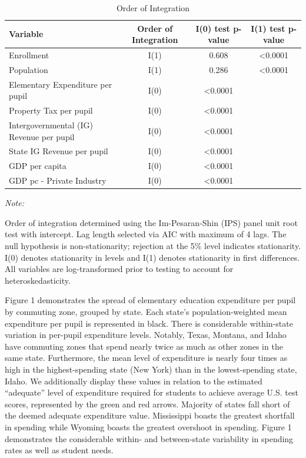 \documentclass[
  10pt,
]{article}
\begin{document}
\begin{table}

\caption{\label{tab:tbl_order_of_integration}Order of Integration}
\centering
\begin{threeparttable}
\begin{tabular}[t]{lccc}
\toprule
Variable & Order of Integration & I(0) test p-value & I(1) test p-value\\
\midrule
Enrollment & I(1) & 0.608 & <0.0001\\
Population & I(1) & 0.286 & <0.0001\\
Elementary Expenditure per pupil & I(0) & <0.0001 & \\
Property Tax per pupil & I(0) & <0.0001 & \\
Intergovernmental (IG) Revenue per pupil & I(0) & <0.0001 & \\
\addlinespace
State IG Revenue per pupil & I(0) & <0.0001 & \\
GDP per capita & I(0) & <0.0001 & \\
GDP pc - Private Industry & I(0) & <0.0001 & \\
\bottomrule
\end{tabular}
\begin{tablenotes}[para]
\item \textit{Note: } 
\item Order of integration determined using the Im-Pesaran-Shin (IPS) panel unit root test with intercept. Lag length selected via AIC with maximum of 4 lags. The null hypothesis is non-stationarity; rejection at the 5\% level indicates stationarity. I(0) denotes stationarity in levels and I(1) denotes stationarity in first differences. All variables are log-transformed prior to testing to account for heteroskedasticity.
\end{tablenotes}
\end{threeparttable}
\end{table}

Figure 1 demonstrates the spread of elementary education expenditure per
pupil by commuting zone, grouped by state. Each state's
population-weighted mean expenditure per pupil is represented in black.
There is considerable within-state variation in per-pupil expenditure
levels. Notably, Texas, Montana, and Idaho have commuting zones that
spend nearly twice as much as other zones in the same state.
Furthermore, the mean level of expenditure is nearly four times as high
in the highest-spending state (New York) than in the lowest-spending
state, Idaho. We additionally display these values in relation to the
estimated ``adequate'' level of expenditure required for students to
achieve average U.S. test scores, represented by the green and red
arrows. Majority of states fall short of the deemed adequate expenditure
value. Mississippi boasts the greatest shortfall in spending while
Wyoming boasts the greatest overshoot in spending. Figure 1 demonstrates
the considerable within- and between-state variability in spending rates
as well as student needs.
\end{document}
